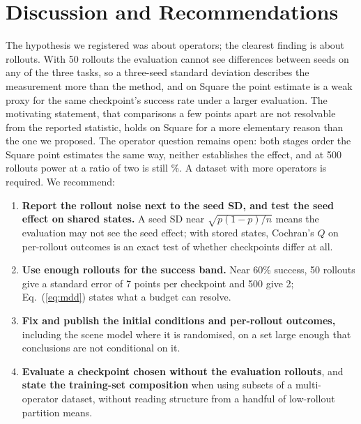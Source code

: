\IfFileExists{IEEEtran.cls}{\documentclass[journal]{IEEEtran}}{\documentclass[10pt,twocolumn]{article}}
\begin{document}
\section{Discussion and Recommendations}
\label{sec:recs}
The hypothesis we registered was about operators; the clearest finding is about rollouts. With 50 rollouts the evaluation cannot see differences between seeds on any of the three tasks, so a three-seed standard deviation describes the measurement more than the method, and on Square the point estimate is a weak proxy for the same checkpoint's success rate under a larger evaluation. The motivating statement, that comparisons a few points apart are not resolvable from the reported statistic, holds on Square for a more elementary reason than the one we proposed. The operator question remains open: both stages order the Square point estimates the same way, neither establishes the effect, and at 500 rollouts power at a ratio of two is still \TwoSqPowTwo\%. A dataset with more operators is required. We recommend:
\begin{enumerate}
\item \textbf{Report the rollout noise next to the seed SD, and test the seed effect on shared states.} A seed SD near $\sqrt{p(1-p)/n}$ means the evaluation may not see the seed effect; with stored states, Cochran's $Q$ on per-rollout outcomes is an exact test of whether checkpoints differ at all.
\item \textbf{Use enough rollouts for the success band.} Near 60\% success, 50 rollouts give a standard error of 7 points per checkpoint and 500 give 2; Eq.~(\ref{eq:mdd}) states what a budget can resolve.
\item \textbf{Fix and publish the initial conditions and per-rollout outcomes,} including the scene model where it is randomised, on a set large enough that conclusions are not conditional on it.
\item \textbf{Evaluate a checkpoint chosen without the evaluation rollouts}, and \textbf{state the training-set composition} when using subsets of a multi-operator dataset, without reading structure from a handful of low-rollout partition means.
\end{enumerate}
\end{document}
